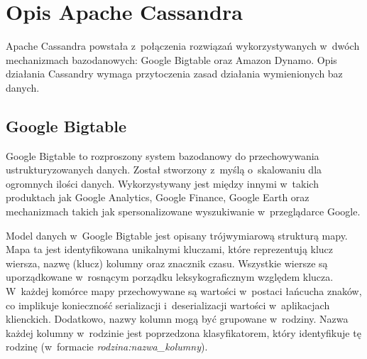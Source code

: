 \section{Opis Apache Cassandra}

Apache Cassandra powstała z~połączenia rozwiązań wykorzystywanych w~dwóch mechanizmach bazodanowych: Google Bigtable oraz Amazon Dynamo. Opis działania Cassandry wymaga przytoczenia zasad działania wymienionych baz danych.

\subsection{Google Bigtable}

Google Bigtable to rozproszony system bazodanowy do przechowywania ustrukturyzowanych danych. Został stworzony z~myślą o~skalowaniu dla ogromnych ilości danych. Wykorzystywany jest między innymi w~takich produktach jak Google Analytics, Google Finance, Google Earth oraz mechanizmach takich jak spersonalizowane wyszukiwanie w~przeglądarce Google. 

Model danych w~Google Bigtable jest opisany trójwymiarową strukturą mapy. Mapa ta jest identyfikowana unikalnymi kluczami, które reprezentują klucz wiersza, nazwę (klucz) kolumny oraz znacznik czasu. Wszystkie wiersze są uporządkowane w~rosnącym porządku leksykograficznym względem klucza. W~każdej komórce mapy przechowywane są wartości w~postaci łańcucha znaków, co implikuje konieczność serializacji i~deserializacji wartości w~aplikacjach klienckich. Dodatkowo, nazwy kolumn mogą być grupowane w~rodziny. Nazwa każdej kolumny w~rodzinie jest poprzedzona klasyfikatorem, który identyfikuje tę rodzinę (w~formacie \emph{rodzina:nazwa\_kolumny}). \cite{googlebigtable} 

